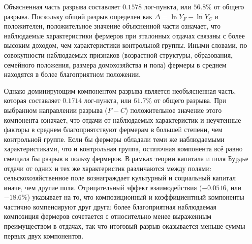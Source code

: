 \documentclass[14pt, a4paper]{article}
\begin{document}
	Объясненная часть разрыва составляет \(0.1578\) лог-пункта, или \(56.8\%\) от общего разрыва. Поскольку общий разрыв определен как \(\Delta=\overline{\ln Y}_F-\overline{\ln Y}_C\) и положителен, положительное значение объясненной части означает, что наблюдаемые характеристики фермеров при эталонных отдачах связаны с более высоким	доходом, чем характеристики контрольной группы. Иными словами, по совокупности наблюдаемых признаков (возрастной структуры, образования, семейного положения, размера домохозяйства и пола) фермеры в среднем находятся в более благоприятном положении. 
	
	Однако доминирующим компонентом разрыва является необъясненная часть,
	которая составляет \(0.1714\) лог-пункта, или \(61.7\%\) от общего разрыва. При выбранном направлении разрыва (\(F-C\)) положительное значение этого компонента означает, что отдачи от наблюдаемых характеристик и неучтенные факторы в среднем благоприятствуют фермерам в большей степени, чем контрольной группе. Если бы фермеры обладали теми же наблюдаемыми характеристиками, что и
	контрольная группа, остаточная компонента всё равно смещала бы разрыв
	в пользу фермеров. В рамках теории капитала и поля Бурдье отдачи от одних и тех же
	характеристик различаются между полями: сельскохозяйственное поле вознаграждает культурный и социальный капитал иначе, чем другие поля.
	Отрицательный эффект взаимодействия (\(-0.0516\), или \(-18.6\%\)) указывает на то, что композиционный и коэффициентный компоненты частично компенсируют друг друга: более благоприятная наблюдаемая композиция фермеров сочетается с
	относительно менее выраженным преимуществом в отдачах, так что итоговый
	разрыв оказывается меньше суммы первых двух компонентов.
	
\end{document}
